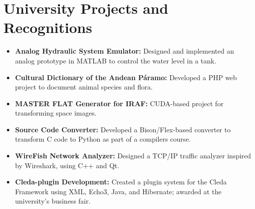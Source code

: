 \documentclass[a4paper,10pt]{article}
\begin{document}
\section*{University Projects and Recognitions}
\sectionline
\begin{itemize}[leftmargin=0.5cm, topsep=0pt, parsep=0pt, itemsep=2pt]
	\item \textbf{Analog Hydraulic System Emulator:} Designed and implemented an
	      analog prototype in MATLAB to control the water level in a tank.
	\item \textbf{Cultural Dictionary of the Andean Páramo:} Developed a PHP web
	      project to document animal species and flora.
	\item \textbf{MASTER FLAT Generator for IRAF:} CUDA-based project for
	      transforming space images.
	\item \textbf{Source Code Converter:} Developed a Bison/Flex-based converter
	      to transform C code to Python as part of a compilers course.
	\item \textbf{WireFish Network Analyzer:} Designed a TCP/IP traffic analyzer
	      inspired by Wireshark, using C++ and Qt.
	\item \textbf{Cleda-plugin Development:} Created a plugin system for the
	      Cleda Framework using XML, Echo3, Java, and Hibernate; awarded at the
	      university's business fair.
\end{itemize}
\end{document}
